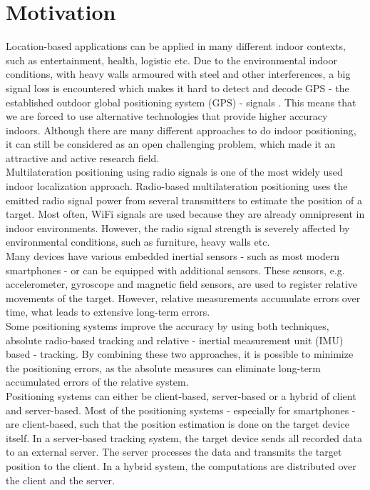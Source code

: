 \section{Motivation}
Location-based applications can be applied in many different indoor contexts, such as entertainment, health, logistic etc. Due to the environmental indoor conditions, with heavy walls armoured with steel and other interferences, a big signal loss is encountered which makes it hard to detect and decode GPS - the established outdoor global positioning system (GPS) - signals \cite{GPSforIndoor}. This means that we are forced to use alternative technologies that provide higher accuracy indoors. Although there are many different approaches to do indoor positioning, it can still be considered as an open challenging problem, which made it an attractive and active research field.\\
\noindent\hspace*{5mm}%
Multilateration positioning using radio signals is one of the most widely used indoor localization approach. Radio-based multilateration positioning uses the emitted radio signal power from several transmitters to estimate the position of a target. Most often, WiFi signals are used because they are already omnipresent in indoor environments. However, the radio signal strength is severely affected by environmental conditions, such as furniture, heavy walls etc.\\
\noindent\hspace*{5mm}%
Many devices have various embedded inertial sensors - such as most modern smartphones - or can be equipped with additional sensors. These sensors, e.g. accelerometer, gyroscope and magnetic field sensors, are used to register relative movements of the target. However, relative measurements accumulate errors over time, what leads to extensive long-term errors.\\
\noindent\hspace*{5mm}%
Some positioning systems improve the accuracy by using both techniques, absolute radio-based tracking and relative - inertial measurement unit (IMU) based - tracking. By combining these two approaches, it is possible to minimize the positioning errors, as the absolute measures can eliminate long-term accumulated errors of the relative system. \\
\noindent\hspace*{5mm}%
Positioning systems can either be client-based, server-based or a hybrid of client and server-based. Most of the positioning systems - especially for smartphones - are client-based, such that the position estimation is done on the target device itself. In a server-based tracking system, the target device sends all recorded data to an external server. The server processes the data and transmits the target position to the client. In a hybrid system, the computations are distributed over the client and the server. \\
